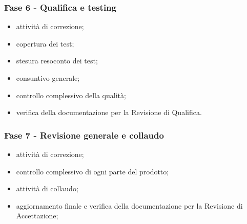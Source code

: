     \subsubsection{Fase 6 - Qualifica e testing}
        \begin{itemize}
            \item attività di correzione;
            \item copertura dei test;
            \item stesura resoconto dei test;
            \item consuntivo generale;
            \item controllo complessivo della qualità;
            \item verifica della documentazione per la Revisione di Qualifica.
        \end{itemize}

    \subsubsection{Fase 7 - Revisione generale e collaudo}
        \begin{itemize}
            \item attività di correzione;
            \item controllo complessivo di ogni parte del prodotto;
            \item attività di collaudo;
            \item aggiornamento finale e verifica della documentazione per la Revisione di Accettazione;
        \end{itemize}
